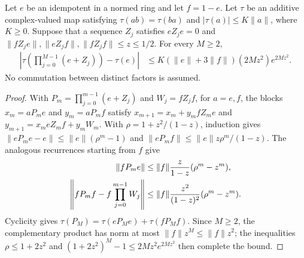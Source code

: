 \begin{lemma}
    \label{thm:ldp_ordered_idempotent_quadratic}
    \leanok
    Let $e$ be an idempotent in a normed ring and let $f=1-e$. Let $\tau$
    be an additive complex-valued map satisfying $\tau(ab)=\tau(ba)$ and
    $|\tau(a)|\le K\lVert a\rVert$, where $K\ge0$. Suppose that a sequence
    $Z_j$ satisfies $eZ_je=0$ and
    $\lVert fZ_je\rVert,\lVert eZ_jf\rVert,\lVert fZ_jf\rVert\le z\le1/2$.
    For every $M\ge2$,
    \begin{align}
        \left|\tau\left(\prod_{j=0}^{M-1}(e+Z_j)\right)-\tau(e)\right|
         & \le K(\lVert e\rVert+3\lVert f\rVert)
        (2Mz^2)e^{2Mz^2}.
        \label{eq:ldp_ordered_quadratic_trace}
    \end{align}
    No commutation between distinct factors is assumed.
\end{lemma}
\begin{proof}\leanok
    With $P_m=\prod_{j=0}^{m-1}(e+Z_j)$ and $W_j=fZ_jf$, for $a=e,f$,
    the blocks $x_m=aP_me$ and $y_m=aP_mf$ satisfy
    $x_{m+1}=x_m+y_mfZ_me$ and
    $y_{m+1}=x_meZ_mf+y_mW_m$.
    With $\rho=1+z^2/(1-z)$, induction gives
    $\lVert eP_me-e\rVert\le\lVert e\rVert(\rho^m-1)$ and
    $\lVert eP_mf\rVert\le\lVert e\rVert z\rho^m/(1-z)$.
    The analogous recurrences starting from $f$ give
    \begin{align}
        \lVert fP_me\rVert
         & \le\lVert f\rVert\frac{z}{1-z}(\rho^m-z^m), \notag \\
        \left\lVert fP_mf-f\prod_{j=0}^{m-1}W_j\right\rVert
         & \le\lVert f\rVert\frac{z^2}{(1-z)^2}(\rho^m-z^m).
        \notag
    \end{align}
    Cyclicity gives $\tau(P_M)=\tau(eP_Me)+\tau(fP_Mf)$.
    Since $M\ge2$, the complementary product has norm at most
    $\lVert f\rVert z^M\le\lVert f\rVert z^2$; the inequalities
    $\rho\le1+2z^2$ and $(1+2z^2)^M-1\le2Mz^2e^{2Mz^2}$ then complete the bound.
\end{proof}

